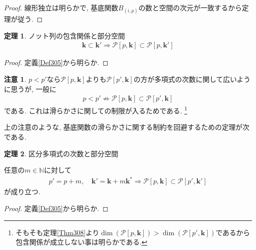 \documentclass{jsarticle}
\newcommand\subknot[1]{{#1}^*}
\theoremstyle{definition}%
\newtheorem{thm}{定理}
\newtheorem*{rem}{注意}
\begin{document}
\begin{proof}
    線形独立は明らかで, 基底関数$B_{(i,p)}$の数と空間の次元が一致するから定理が従う.
\end{proof}

\begin{screen}
	\begin{thm}
        \label{Thm310}
		ノット列の包含関係と部分空間
		\begin{align}
			\bm{k}\subset\bm{k}'
			\Rightarrow
			\mathcal{P}[p, \bm{k}]\subset \mathcal{P}[p, \bm{k}']
		\end{align}
	\end{thm}
\end{screen}
\begin{proof}
	定義\ref{Def305}から明らか.
\end{proof}

\begin{rem}
	$p<p'$なら$\mathcal{P}[p, \bm{k}]$よりも$\mathcal{P}[p', \bm{k}]$の方が多項式の次数に関して広いように思うが, 一般に
	\begin{align}
		p<p'
		\not\Rightarrow
		\mathcal{P}[p, \bm{k}]\subset \mathcal{P}[p', \bm{k}]
	\end{align}
	である.
	これは滑らかさに関しての制限が入るためである.%
	\footnote{そもそも定理\ref{Thm308}より$\dim(\mathcal{P}[p, \bm{k}])>\dim(\mathcal{P}[p', \bm{k}])$であるから包含関係が成立しない事は明らかである.}
\end{rem}

上の注意のような, 基底関数の滑らかさに関する制約を回避するための定理が次である.
\begin{screen}
	\begin{thm}
        \label{Thm311}
		区分多項式の次数と部分空間

		任意の$m\in\mathbb{N}$に対して
		\begin{align}
			p'=p+m, \quad
			\bm{k}'=\bm{k}+m\subknot{\bm{k}}
			\Rightarrow
			\mathcal{P}[p, \bm{k}]\subset \mathcal{P}[p', \bm{k}']
		\end{align}
		が成り立つ.
	\end{thm}
\end{screen}
\begin{proof}
	定義\ref{Def305}から明らか.
\end{proof}



\newpage
\end{document}
